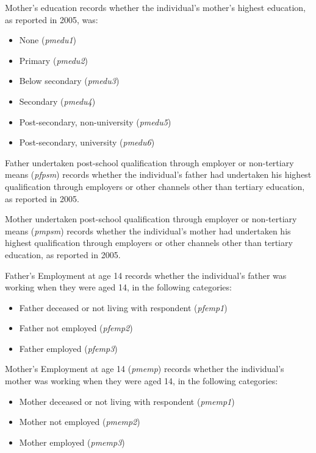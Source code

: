 \documentclass[12pt, a4paper]{article}
\begin{document}
Mother’s education records whether the individual’s mother’s highest education, as reported in 2005, was:
\begin{itemize}
  \item None (\textit{p\textunderscore{}medu1})
  \item Primary (\textit{p\textunderscore{}medu2})
  \item Below secondary (\textit{p\textunderscore{}medu3})
  \item Secondary (\textit{p\textunderscore{}medu4})
  \item Post-secondary, non-university (\textit{p\textunderscore{}medu5})
  \item Post-secondary, university (\textit{p\textunderscore{}medu6}) 
\end{itemize}  
 
Father undertaken post-school qualification through employer or non-tertiary means (\textit{p\textunderscore{}fpsm}) records whether the individual’s father had undertaken his highest qualification through employers or other channels other than tertiary education, as reported in 2005. 

Mother undertaken post-school qualification through employer or non-tertiary means (\textit{p\textunderscore{}mpsm}) records whether the individual’s mother had undertaken his highest qualification through employers or other channels other than tertiary education, as reported in 2005. 

Father’s Employment at age 14 records whether the individual’s father was working when they were aged 14, in the following categories:
\begin{itemize}
  \item Father deceased or not living with respondent (\textit{p\textunderscore{}femp1})
  \item Father not employed (\textit{p\textunderscore{}femp2})
  \item Father employed (\textit{p\textunderscore{}femp3})
\end{itemize}  
 
Mother’s Employment at age 14 (\textit{p\textunderscore{}memp}) records whether the individual’s mother was working when they were aged 14, in the following categories:
\begin{itemize}
  \item Mother deceased or not living with respondent (\textit{p\textunderscore{}memp1})
  \item Mother not employed (\textit{p\textunderscore{}memp2})
  \item Mother employed (\textit{p\textunderscore{}memp3})
\end{itemize}  
 
\end{document}
